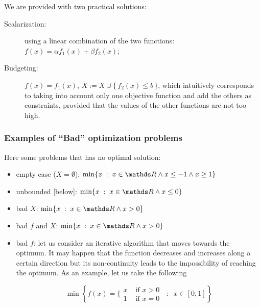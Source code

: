 \documentclass[computational_mathematics.tex]{subfiles}
\begin{document}
\newpage
We are provided with two practical solutions:

\begin{description}
  \item[{\sc Scalarization:}] using a linear combination of the two functions: $f(x) = \alpha f_1(x) + \beta f_2(x)$;
  \item[{\sc Budgeting:}] $f(x) = f_1(x)$, $X := X \cup \{ \, f_2(x) \leq b \, \}$, which intuitively corresponds to taking into account only one objective function and add the others as constraints, provided that the values of the other functions are not too high.
\end{description}

\subsubsection{Examples of “Bad” optimization problems}
Here some problems that has no optimal solution:
\begin{itemize}
    \item empty case ($X = \emptyset$): $\min\{ x \; : \; x \in \R \land x \leq -1 \land x \geq 1\}$
    \item unbounded [below]:  $\min\{ x \; : \; x \in \R \land x \leq 0\}$
    \item bad $X$:  $\min\{ x \; : \; x \in \R \land x > 0\}$
    \item bad $f$ and  $X$:  $\min\{ x \; : \; x \in \R \land x > 0\}$
    \item bad $f$: let us consider an iterative algorithm that moves towards the optimum.
It may happen that the function decreases and increases along a certain direction but its non-continuity leads to the impossibility of reaching the optimum.
As an example, let us take the following

\[
  \min \left\{f(x) =\bigg\{\begin{array}{ll} x & \mbox{ if } x > 0 \\
        1 & \mbox{ if } x = 0
        \end{array} \; \; : \; \; x \in [0, 1]\right\}
\]
\end{itemize}
\newpage
\end{document}

